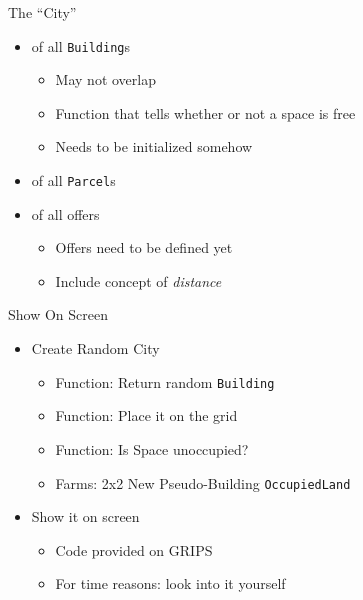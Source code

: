 
\begin{frame}[fragile]{The \enquote{City}}
%
\begin{itemize}
\item {} of all \texttt{Building}s
	\begin{itemize}
	\item May not overlap
	\item Function that tells whether or not a space is free
	\item Needs to be initialized somehow
	\end{itemize}
\item {} of all \texttt{Parcel}s
\item {} of all offers
	\begin{itemize}
	\item Offers need to be defined yet
	\item Include concept of \emph{distance}
	\end{itemize}
\end{itemize}
%
\end{frame}


\begin{frame}[fragile]{Show On Screen}
%
\begin{itemize}
\item Create Random City
	\begin{itemize}
	\item Function: Return random \texttt{Building}
	\item Function: Place it on the grid
	\item Function: Is Space unoccupied?
	\item Farms: 2x2 \Thus New Pseudo-Building \texttt{OccupiedLand}
	\end{itemize}
\item Show it on screen
	\begin{itemize}
	\item Code provided on GRIPS
	\item For time reasons: look into it yourself
	\end{itemize}
\end{itemize}
%
\end{frame}


